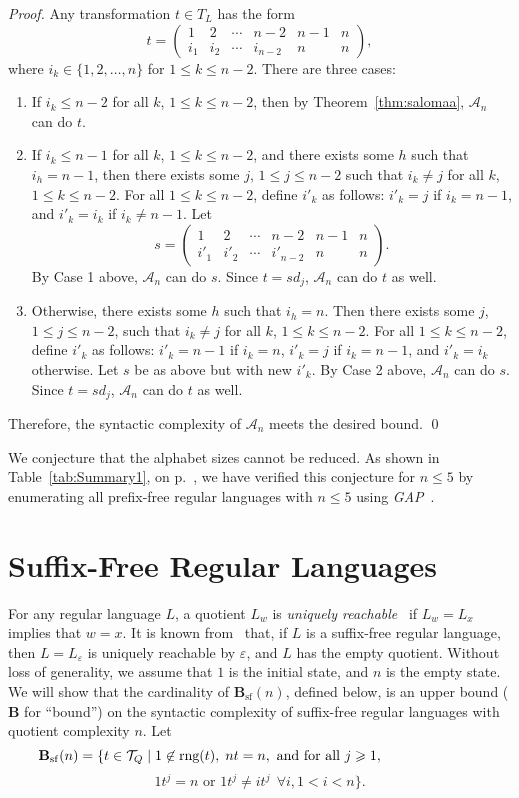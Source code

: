 \documentclass{llncs}
\renewcommand{\le}{\leqslant}
\renewcommand{\ge}{\geqslant}
\newcommand{\eps}{\varepsilon}
\newcommand{\be}{\begin{enumerate}}
\newcommand{\ee}{\end{enumerate}}
\newcommand{\txt}[1]{\mbox{ #1 }}
\newcommand{\timg}{\mathop{\mbox{rng}}}
\newcommand{\cA}{{\mathcal A}}
\newcommand{\cT}{{\mathcal T}}
\newcommand{\Bsf}{\mathbf{B}_{\mathrm{sf}}}
\begin{document}
\begin{proof}
Any transformation $t \in T_L$ has the form 
$$t=\left( \begin{array}{cccccc}
1 & 2 & \cdots & n-2 & n-1 & n \\
i_1 & i_2 & \cdots & i_{n-2} & n & n
\end{array} \right ),
$$
where $i_k\in\{1,2,\ldots,n\}$ for $1\le k\le n-2$.
There are three cases: 
\be
\item If $i_k\le n-2$ for all $k$, $1\le k\le n-2$, then by Theorem~\ref{thm:salomaa}, $\cA_n$ can do $t$.\\
\item If $i_k\le n-1$ for all $k$, $1\le k\le n-2$, and there exists some $h$ such that $i_h= n-1$, then there exists some $j$, $1\le j\le n-2$ such that $i_k\ne j$ for all $k$, $1\le k\le n-2$.
For all $1\le k\le n-2$, define $i'_k$ as follows: $i'_k = j$ if $i_k=n-1$, and $i'_k = i_k$ if $i_k\ne n-1$. 
Let 
$$
s=\left( \begin{array}{cccccc}
1 & 2 & \cdots & n-2 & n-1 & n \\
i'_1 & i'_2 & \cdots & i'_{n-2} & n & n
\end{array} \right ).$$
By Case 1 above, $\cA_n$  can do $s$.
Since $t=sd_j$, $\cA_n$  can do $t$ as well.\\
\item Otherwise, there exists some $h$ such that $i_h= n$. Then there exists some $j$, $1\le j\le n-2$, such that $i_k\ne j$ for all $k$, $1\le k\le n-2$.
For all $1\le k\le n-2$, define  $i'_k$ as follows: $i'_k = n-1$ if $i_k=n$, $i'_k = j$ if $i_k=n-1$, and $i'_k = i_k$ otherwise.
Let $s$ be as above but with new $i'_k$.
By Case 2 above, $\cA_n$  can do $s$.
Since $t=sd_j$, $\cA_n$  can do $t$ as well.
\ee

Therefore, the syntactic complexity of $\cA_n$ meets the desired bound. \qed
\end{proof}

We conjecture that the alphabet sizes cannot be reduced. As shown in Table~\ref{tab:Summary1}, 
on p.~\pageref{table1}, 
we have verified this conjecture for $n \le 5$ by enumerating all prefix-free regular languages with $n\le 5$ using \emph{GAP}~\cite{GAP}.
\medskip


\section{Suffix-Free Regular Languages}\label{sec:sf}


For any regular language $L$, a quotient $L_w$ is \emph{uniquely reachable}~\cite{Brz09} if $L_w=L_x$ implies that $w=x$. 
It is known from~\cite{HS09} that, if $L$ is a suffix-free regular language, then $L=L_\eps$  is uniquely reachable by $\eps$, and $L$ has the empty quotient. 
Without loss of generality,  we assume that $1$ is the initial state, and $n$ is the empty state. 
We will show that the cardinality of $\Bsf(n)$, defined below, is an upper bound ($\mathbf{B}$ for ``bound'') on the syntactic complexity of suffix-free regular languages with quotient complexity $n$. Let
$$\Bsf(n) = \{ t \in \cT_{Q} \mid 1 \not\in \timg(t), \; nt = n, \txt{and for all} j\ge 1,
 \hspace{2.5cm}$$ 
$$1t^j = n \txt{or} 1t^j \neq it^j ~~\forall i, 1 < i < n\}.$$
\end{document}
